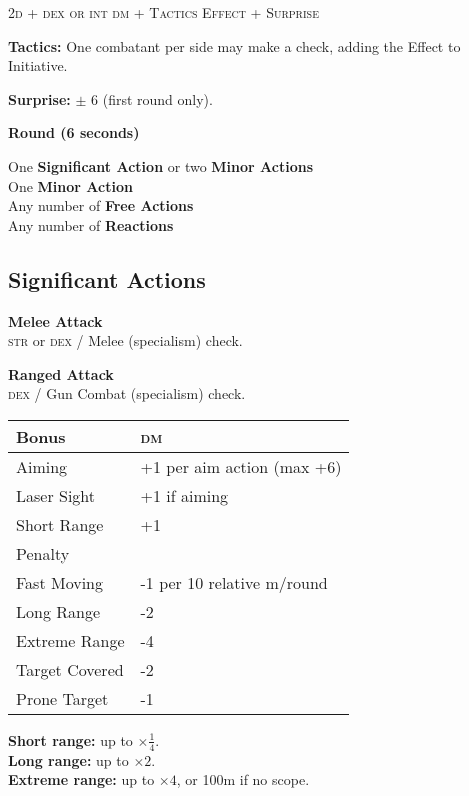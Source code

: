 \documentclass[10pt]{article}
\newenvironment{emphbox}{\begin{Sbox}\begin{minipage}{\columnwidth - 2\fboxsep - 2\fboxrule - \shadowsize}\small}{\end{minipage}\end{Sbox}\shadowbox{\TheSbox}}
\newcommand\dice[1]{\textsc{#1}}
\newcommand{\skillcheck}[2]{\textsc{#1} / #2 check}
\newcommand{\oskillcheck}[3]{\textsc{#1} or \textsc{#2} / #3 check}
\begin{document}
\begin{multicols}{3}
\begin{emphbox}
  \begin{center}
    \dice{2d + dex {\normalfont or} int dm + Tactics Effect + Surprise}
  \end{center}

  \textbf{Tactics:} One combatant per side may make a check, adding
  the Effect to Initiative.

  \textbf{Surprise:} $\pm$ 6 (first round only).

  \begin{center}
    \textbf{Round (6 seconds)}
  \end{center}

  One \textbf{Significant Action} or two \textbf{Minor Actions}\\
  One \textbf{Minor Action}\\
  Any number of \textbf{Free Actions}\\
  Any number of \textbf{Reactions}
\end{emphbox}

\subsection{Significant Actions}

\textbf{Melee Attack}\\
\oskillcheck{str}{dex}{Melee (specialism)}.

\textbf{Ranged Attack}\\
\skillcheck{dex}{Gun Combat (specialism)}.

\begin{tabularx}{\linewidth}{lX} \toprule
Bonus & \textsc{dm} \\ \midrule
Aiming & +1 per aim action (max +6) \\
Laser Sight & +1 if aiming \\
Short Range & +1 \\ \midrule
Penalty & \\ \midrule
Fast Moving & -1 per 10 relative m/round \\
Long Range & -2 \\
Extreme Range & -4 \\
Target Covered & -2 \\
Prone Target & -1 \\ \bottomrule
\end{tabularx}

\textbf{Short range:} up to $\times\frac{1}{4}$.\\
\textbf{Long range:} up to $\times 2$.\\
\textbf{Extreme range:} up to $\times 4$, or 100m if no scope.


\end{multicols}
\end{document}
